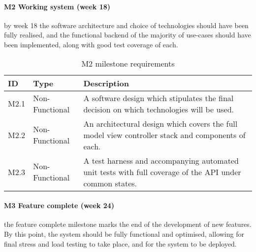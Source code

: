 \paragraph{M2 Working system (week 18)} by week 18 the software architecture and
choice of technologies should have been fully realised, and the functional
backend of the majority of use-cases should have been implemented, along with
good test coverage of each.

\begin{table}[H]
\centering
\begin{tabular}{ l l p{12cm} }
\textbf{ID} & \textbf{Type} & \textbf{Description}\\ \hline

M2.1 & Non-Functional & A software design which stipulates the final decision on
which technologies will be used.\\

M2.2 & Non-Functional & An architectural design which covers the full model view
controller stack and components of each.\\

M2.3 & Non-Functional & A test harness and accompanying automated unit tests
with full coverage of the API under common states.\\

\hline
\end{tabular}
\caption{M2 milestone requirements}
\label{tab:m2-requirements}
\end{table}

\paragraph{M3 Feature complete (week 24)} the feature complete milestone marks
the end of the development of new features. By this point, the system should be
fully functional and optimised, allowing for final stress and load testing to
take place, and for the system to be deployed.


